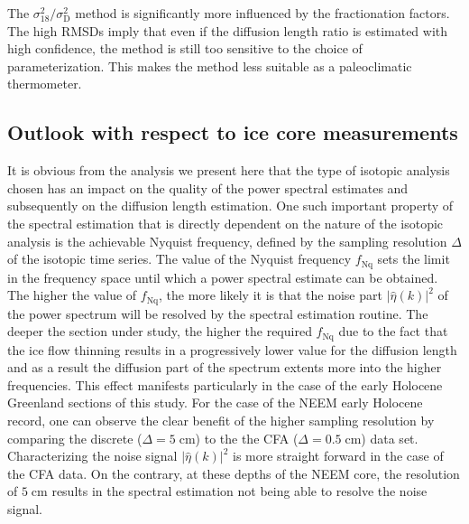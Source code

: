 \documentclass[11pt, draftcls, onecolumn]{IEEEtran} %
\numberwithin{equation}{section}
\numberwithin{table}{section}
\numberwithin{figure}{section}
\begin{document}
The ${\sigma^2_{18}}/{\sigma^2_\mathrm{D}}$ method is significantly more influenced by the 
fractionation factors. 
The high RMSDs imply that even if the diffusion length ratio is estimated with high confidence,
the method is still too sensitive to the choice of parameterization.
This makes the method less suitable as a paleoclimatic thermometer. 



\subsection{Outlook with respect to ice core measurements} \label{sec:outlook}
It is obvious from the analysis we present here that the type of isotopic analysis chosen has an 
impact on the quality of the power spectral estimates and subsequently on the diffusion length estimation.
One such important property of the spectral estimation that is directly dependent on the nature of the isotopic analysis
is the achievable Nyquist frequency, defined by the sampling resolution $\Delta$ of the isotopic time series.
The value of the Nyquist frequency $f_{\mathrm{Nq}}$ sets the limit in the frequency space until which a power spectral estimate can be obtained.
The higher the value of  $f_{\mathrm{Nq}}$, the more likely it is that the noise part  ${\vert \hat{\eta} \left( k \right) \vert} ^{2}$ 
of the power spectrum will be resolved by the spectral estimation routine.
The deeper the section under study, the higher the required $f_{\mathrm{Nq}}$ due to the fact that the ice flow thinning
results in a progressively lower value for the diffusion length and as a result the diffusion part of the spectrum extents
more into the higher frequencies. 
This effect manifests particularly in the case of the early Holocene Greenland sections of this study.
For the case of the NEEM early Holocene record, one can observe the clear benefit of the higher sampling resolution
by comparing the discrete ($\Delta = 5 \;\mathrm{cm}$) to the the CFA ($\Delta = 0.5 \;\mathrm{cm}$) data set.
Characterizing the noise  signal ${\vert \hat{\eta} \left( k \right) \vert} ^{2}$ is more straight forward in the case of the CFA data.
On the contrary, at these depths of the NEEM core, the resolution of $5 \;\mathrm{cm}$ results in the spectral estimation
not being able to resolve the noise signal.
\end{document}
